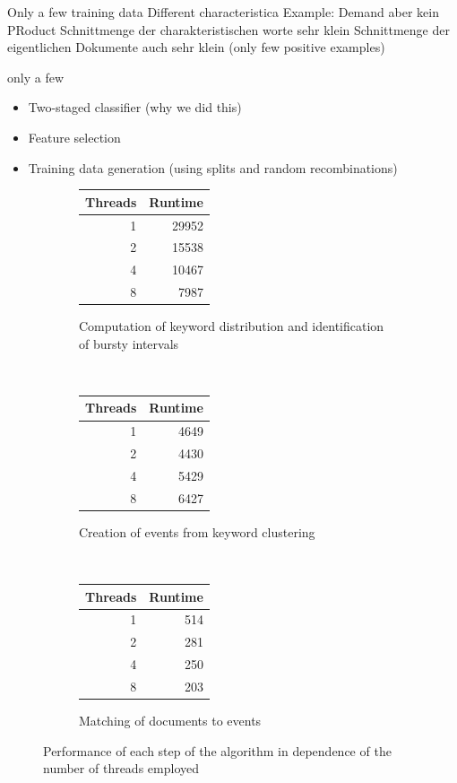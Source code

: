 Only a few training data
Different characteristica
Example: Demand aber kein PRoduct
Schnittmenge der charakteristischen worte sehr klein
Schnittmenge der eigentlichen Dokumente auch sehr klein (only few positive examples)

only a few 

\begin{itemize}
	\item Two-staged classifier (why we did this)
	\item Feature selection
	\item Training data generation (using splits and random recombinations)
\end{itemize}


\begin{figure}
	\centering
	\begin{subfigure}[t]{0.3\textwidth}
		\begin{tabular}{r | r}
			\textbf{Threads} & \textbf{Runtime}\\
			\hline
			1 & 29952\\
			2 & 15538\\
			4 & 10467\\
			8 & 7987
		\end{tabular}
		\caption{Computation of keyword distribution and identification of bursty intervals}
	\end{subfigure}~
	\begin{subfigure}[t]{0.3\textwidth}
		\begin{tabular}{r | r}
			\textbf{Threads} & \textbf{Runtime}\\
			\hline
			1 & 4649\\
			2 & 4430\\
			4 & 5429\\
			8 & 6427
		\end{tabular}
		\caption{Creation of events from keyword clustering}
	\end{subfigure}~
	\begin{subfigure}[t]{0.3\textwidth}
		\begin{tabular}{r | r}
			\textbf{Threads} & \textbf{Runtime}\\
			\hline
			1 & 514\\
			2 & 281\\
			4 & 250\\
			8 & 203
		\end{tabular}
		\caption{Matching of documents to events}
	\end{subfigure}
	\caption{Performance of each step of the algorithm in dependence of the number of threads employed}
	\label{fig:scalability}
\end{figure}
